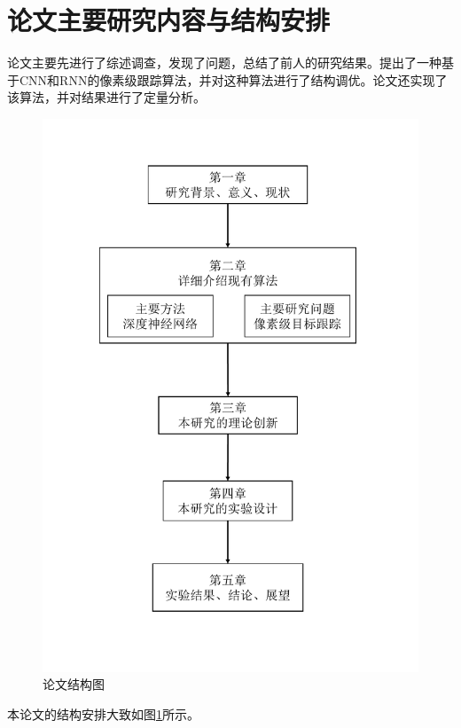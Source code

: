\newpage
\section{论文主要研究内容与结构安排}
论文主要先进行了综述调查，发现了问题，总结了前人的研究结果。提出了一种基于CNN和RNN的像素级跟踪算法，并对这种算法进行了结构调优。论文还实现了该算法，并对结果进行了定量分析。

\begin{figure}[htbp!]
    \centering
    \includegraphics[width = 1.\textwidth]{chap/img/thesis_structure.pdf}
    \caption{
        论文结构图
        }\label{fig:thesis_structure2}
\end{figure}
\par
本论文的结构安排大致如图\ref{fig:thesis_structure2}所示。